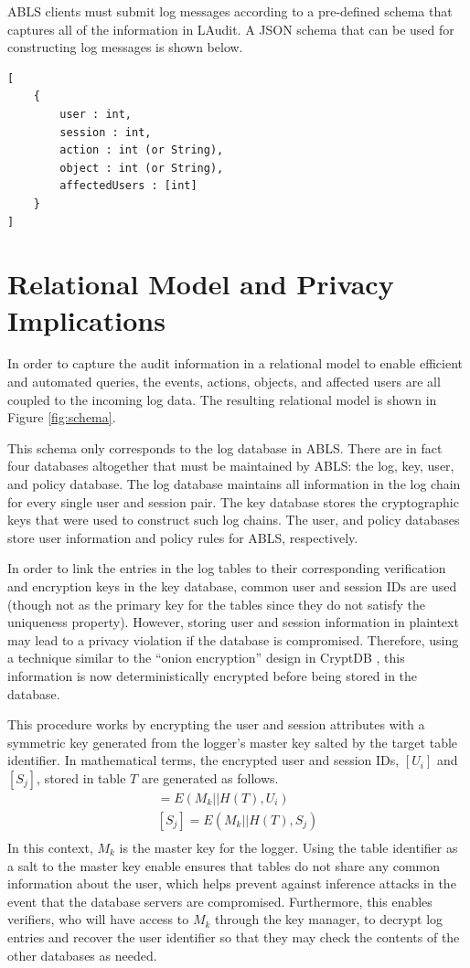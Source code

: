 \documentclass{sig-alternate}
\begin{document}
ABLS clients must submit log messages according to a pre-defined schema that captures
all of the information in LAudit. A JSON schema that can be used for constructing log messages 
is shown below.

\begin{lstlisting}
[
    {
        user : int,
        session : int,
        action : int (or String),
        object : int (or String),
        affectedUsers : [int]
    }
]
\end{lstlisting}

\section{Relational Model and Privacy Implications}
In order to capture the audit information in a relational model to enable efficient and automated queries, 
the events, actions, objects, and affected users are all coupled to the incoming log data. The resulting relational
model is shown in Figure \ref{fig:schema}.

This schema only corresponds to the log database in ABLS. There are in fact four databases altogether that must be maintained by ABLS:
the log, key, user, and policy database. The log database maintains all information in the log chain for every 
single user and session pair. The key database stores the cryptographic keys that were used to construct
such log chains. The user, and policy databases store user information and policy rules for ABLS, respectively. 

In order to link the entries in the log tables to their corresponding verification and encryption keys in the key database,
common user and session IDs are used (though not as the primary key for the tables since they do not satisfy
the uniqueness property). However, storing user and session information in plaintext may lead to a privacy violation
if the database is compromised. Therefore, using a technique similar to the ``onion encryption'' design in
CryptDB \cite{Popa2012-CryptDB}, this information is now deterministically encrypted before being stored in the database.

This procedure works by encrypting the user and session attributes with a symmetric key generated
from the logger's master key salted by the target table identifier. In mathematical
terms, the encrypted user and session IDs, $[U_i]$ and $[S_j]$, stored in table $T$ are generated as follows.
\begin{align*}
[U_i] = E(M_k || H(T), U_i) \\
[S_j] = E(M_k || H(T), S_j) \\
\end{align*}
In this context, $M_k$ is the master key for the logger. Using the table identifier as a salt to the master key 
enable ensures that tables do not share any common information about the user, which helps prevent against 
inference attacks in the event that the database servers are compromised. Furthermore, this enables verifiers,
who will have access to $M_k$ through the key manager, to decrypt log entries and recover the user identifier 
so that they may check the contents of the other databases as needed.
\end{document}
